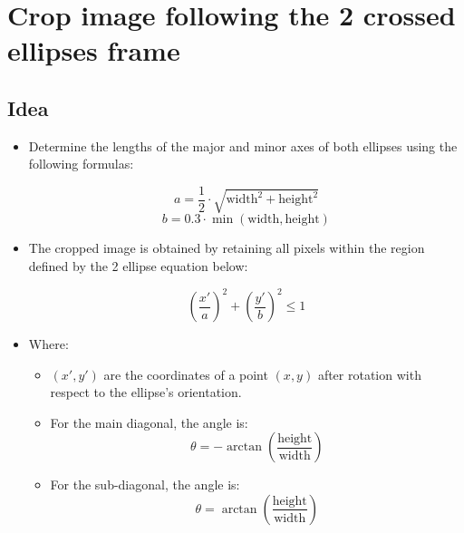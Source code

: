 \chapter{Crop image following the 2 crossed ellipses frame}

\section{Idea}
\begin{itemize}
    \item Determine the lengths of the major and minor axes of both ellipses using the following formulas:
    \begin{center}
        \[
        a = \frac{1}{2} \cdot \sqrt{\text{width}^2 + \text{height}^2}
        \]
        \[
        b = 0.3 \cdot \min(\text{width}, \text{height})
        \]
    \end{center}

    \item The cropped image is obtained by retaining all pixels within the region defined by the 2 ellipse equation below:
    \begin{center}
        \[
        \left( \frac{x'}{a} \right)^2 + \left( \frac{y'}{b} \right)^2 \le 1
        \]
    \end{center}

    \item Where:
    \begin{itemize}[label=$\circ$]
        \item \( (x', y') \) are the coordinates of a point \((x, y)\) after rotation with respect to the ellipse's orientation.
        \item For the main diagonal, the angle is:
        \[
        \theta = -\arctan\left(\frac{\text{height}}{\text{width}}\right)
        \]
        
        \item For the sub-diagonal, the angle is:
        \[
        \theta = \arctan\left(\frac{\text{height}}{\text{width}}\right)
        \]
    \end{itemize}
\end{itemize}

